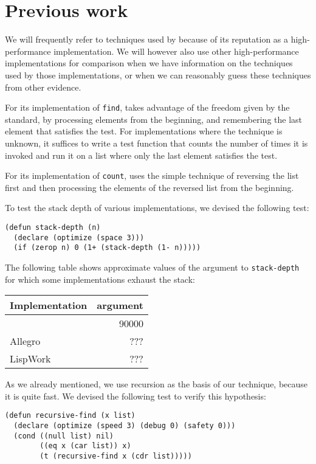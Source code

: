 \section{Previous work}

We will frequently refer to techniques used by \sbcl{} because of its
reputation as a high-performance implementation.  We will however also
use other high-performance implementations for comparison when we have
information on the techniques used by those implementations, or when
we can reasonably guess these techniques from other evidence.

For its implementation of \texttt{find}, \sbcl{} takes advantage of
the freedom given by the standard, by processing elements from the
beginning, and remembering the last element that satisfies the test.
For implementations where the technique is unknown, it suffices to
write a test function that counts the number of times it is invoked
and run it on a list where only the last element satisfies the test.

For its implementation of \texttt{count}, \sbcl{} uses the simple
technique of reversing the list first and then processing the elements
of the reversed list from the beginning.

To test the stack depth of various implementations, we devised the
following test:

{\small\begin{verbatim}
(defun stack-depth (n)
  (declare (optimize (space 3)))
  (if (zerop n) 0 (1+ (stack-depth (1- n)))))
\end{verbatim}}

The following table shows approximate values of the argument to
\texttt{stack-depth} for which some implementations exhaust the stack:

\begin{tabular}{|l|r|}
\hline
Implementation & argument\\
\hline
\hline
\sbcl{} & 90000\\
\hline
Allegro & ???\\
\hline
LispWork & ???\\
\hline
\end{tabular}

As we already mentioned, we use recursion as the basis of our
technique, because it is quite fast.  We devised the following test to
verify this hypothesis:

{\small\begin{verbatim}
(defun recursive-find (x list)
  (declare (optimize (speed 3) (debug 0) (safety 0)))
  (cond ((null list) nil)
        ((eq x (car list)) x)
        (t (recursive-find x (cdr list)))))
\end{verbatim}}

